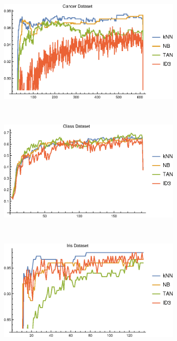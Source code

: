 \documentclass{article}
\begin{document}
		\begin{figure}[h]
			\centering
			\begin{subfigure}[b]{0.49\textwidth}
				\centering
				\includegraphics[width=\textwidth]{figs/plot_conv_cancer}					
			\end{subfigure}	\	
			\begin{subfigure}[b]{0.49\textwidth}
				\centering
				\includegraphics[width=\textwidth]{figs/plot_conv_glass}					
			\end{subfigure} \	
			\begin{subfigure}[b]{0.49\textwidth}
				\centering
				\includegraphics[width=\textwidth]{figs/plot_conv_iris}					

\end{subfigure}
\end{figure}
\end{document}
